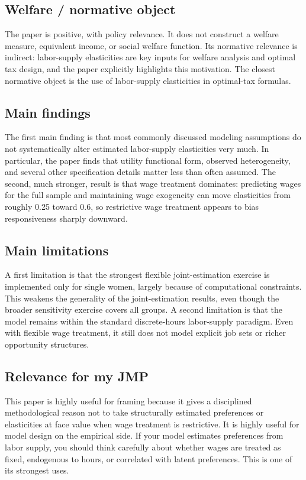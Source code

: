 \documentclass[11pt,a4paper]{article}
\begin{document}
\subsection*{Welfare / normative object}
The paper is positive, with policy relevance. It does not construct a welfare measure, equivalent income, or social welfare function. Its normative relevance is indirect: labor-supply elasticities are key inputs for welfare analysis and optimal tax design, and the paper explicitly highlights this motivation. The closest normative object is the use of labor-supply elasticities in optimal-tax formulas.

\subsection*{Main findings}
The first main finding is that most commonly discussed modeling assumptions do not systematically alter estimated labor-supply elasticities very much. In particular, the paper finds that utility functional form, observed heterogeneity, and several other specification details matter less than often assumed. The second, much stronger, result is that wage treatment dominates: predicting wages for the full sample and maintaining wage exogeneity can move elasticities from roughly 0.25 toward 0.6, so restrictive wage treatment appears to bias responsiveness sharply downward.

\subsection*{Main limitations}
A first limitation is that the strongest flexible joint-estimation exercise is implemented only for single women, largely because of computational constraints. This weakens the generality of the joint-estimation results, even though the broader sensitivity exercise covers all groups. A second limitation is that the model remains within the standard discrete-hours labor-supply paradigm. Even with flexible wage treatment, it still does not model explicit job sets or richer opportunity structures.

\subsection*{Relevance for my JMP}
This paper is highly useful for framing because it gives a disciplined methodological reason not to take structurally estimated preferences or elasticities at face value when wage treatment is restrictive. It is highly useful for model design on the empirical side. If your model estimates preferences from labor supply, you should think carefully about whether wages are treated as fixed, endogenous to hours, or correlated with latent preferences. This is one of its strongest uses.
\end{document}
